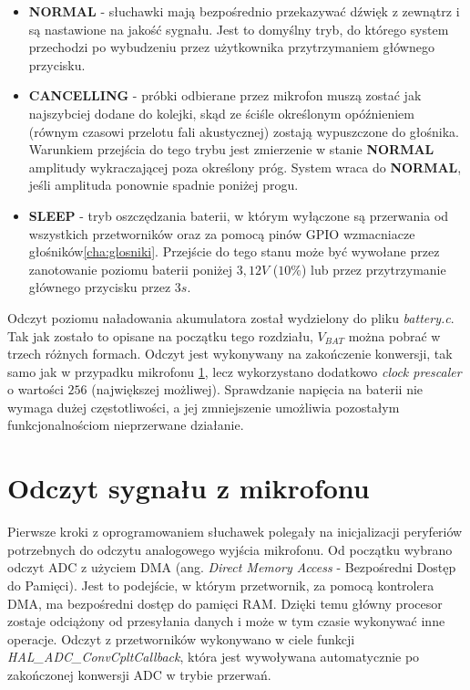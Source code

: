 \begin{itemize}
	\item \textbf{NORMAL} - słuchawki mają bezpośrednio przekazywać dźwięk z zewnątrz i są nastawione na jakość sygnału. Jest to domyślny tryb, do którego system przechodzi po wybudzeniu przez użytkownika przytrzymaniem głównego przycisku.
	
	\item \textbf{CANCELLING} - próbki odbierane przez mikrofon muszą zostać jak najszybciej dodane do kolejki, skąd ze ściśle określonym opóźnieniem (równym czasowi przelotu fali akustycznej) zostają wypuszczone do głośnika. Warunkiem przejścia do tego trybu jest zmierzenie w stanie \textbf{NORMAL} amplitudy wykraczającej poza określony próg. System wraca do \textbf{NORMAL}, jeśli amplituda ponownie spadnie poniżej progu.
	
	\item \textbf{SLEEP} - tryb oszczędzania baterii, w którym wyłączone są przerwania od wszystkich przetworników oraz za pomocą pinów GPIO wzmacniacze głośników\ref{cha:glosniki}. Przejście do tego stanu może być wywołane przez zanotowanie poziomu baterii poniżej $3,12V$ ($10\%$) lub przez przytrzymanie głównego przycisku przez $3s$.
\end{itemize}

Odczyt poziomu naładowania akumulatora został wydzielony do pliku \textit{battery.c}. Tak jak zostało to opisane na początku tego rozdziału, $V_{BAT}$ można pobrać w trzech różnych formach. Odczyt jest wykonywany na zakończenie konwersji, tak samo jak w przypadku mikrofonu \ref{cha:soft_mic}, lecz wykorzystano dodatkowo \textit{clock prescaler} o wartości $256$ (największej możliwej). Sprawdzanie napięcia na baterii nie wymaga dużej częstotliwości, a jej zmniejszenie umożliwia pozostałym funkcjonalnościom nieprzerwane działanie.

\section{Odczyt sygnału z mikrofonu}
\label{cha:soft_mic}

Pierwsze kroki z oprogramowaniem słuchawek polegały na inicjalizacji peryferiów potrzebnych do odczytu analogowego wyjścia mikrofonu. Od początku wybrano odczyt ADC z użyciem DMA (ang. \textit{Direct Memory Access} - Bezpośredni Dostęp do Pamięci). Jest to podejście, w którym przetwornik, za pomocą kontrolera DMA, ma bezpośredni dostęp do pamięci RAM. Dzięki temu główny procesor zostaje odciążony od przesyłania danych i może w tym czasie wykonywać inne operacje. Odczyt z przetworników wykonywano w ciele funkcji \textit{HAL\_ADC\_ConvCpltCallback}, która jest wywoływana automatycznie po zakończonej konwersji ADC w trybie przerwań.

